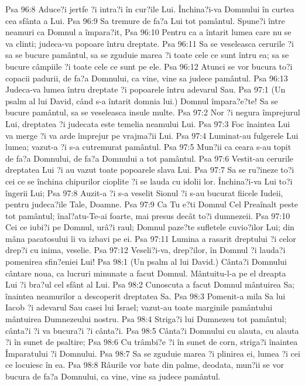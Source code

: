 Psa 96:8  Aduce?i jertfe ?i intra?i în cur?ile Lui. Închina?i-va Domnului în curtea cea sfânta a Lui.
Psa 96:9  Sa tremure de fa?a Lui tot pamântul. Spune?i între neamuri ca Domnul a împara?it,
Psa 96:10  Pentru ca a întarit lumea care nu se va clinti; judeca-va popoare întru dreptate.
Psa 96:11  Sa se veseleasca cerurile ?i sa se bucure pamântul, sa se zguduie marea ?i toate cele ce sunt întru ea; sa se bucure câmpiile ?i toate cele ce sunt pe ele.
Psa 96:12  Atunci se vor bucura to?i copacii padurii, de fa?a Domnului, ca vine, vine sa judece pamântul.
Psa 96:13  Judeca-va lumea întru dreptate ?i popoarele întru adevarul Sau.
Psa 97:1  (Un psalm al lui David, când s-a întarit domnia lui.) Domnul împara?e?te! Sa se bucure pamântul, sa se veseleasca insule multe.
Psa 97:2  Nor ?i negura împrejurul Lui, dreptatea ?i judecata este temelia neamului Lui.
Psa 97:3  Foc înaintea Lui va merge ?i va arde împrejur pe vrajma?ii Lui.
Psa 97:4  Luminat-au fulgerele Lui lumea; vazut-a ?i s-a cutremurat pamântul.
Psa 97:5  Mun?ii ca ceara s-au topit de fa?a Domnului, de fa?a Domnului a tot pamântul.
Psa 97:6  Vestit-au cerurile dreptatea Lui ?i au vazut toate popoarele slava Lui.
Psa 97:7  Sa se ru?ineze to?i cei ce se închina chipurilor cioplite ?i se lauda cu idolii lor. Închina?i-va Lui to?i îngerii Lui;
Psa 97:8  Auzit-a ?i s-a veselit Sionul ?i s-au bucurat fiicele Iudeii, pentru judeca?ile Tale, Doamne.
Psa 97:9  Ca Tu e?ti Domnul Cel Preaînalt peste tot pamântul; înal?atu-Te-ai foarte, mai presus decât to?i dumnezeii.
Psa 97:10  Cei ce iubi?i pe Domnul, urâ?i raul; Domnul paze?te sufletele cuvio?ilor Lui; din mâna pacatosului îi va izbavi pe ei.
Psa 97:11  Lumina a rasarit dreptului ?i celor drep?i cu inima, veselie.
Psa 97:12  Veseli?i-va, drep?ilor, în Domnul ?i lauda?i pomenirea sfin?eniei Lui!
Psa 98:1  (Un psalm al lui David.) Cânta?i Domnului cântare noua, ca lucruri minunate a facut Domnul. Mântuitu-l-a pe el dreapta Lui ?i bra?ul cel sfânt al Lui.
Psa 98:2  Cunoscuta a facut Domnul mântuirea Sa; înaintea neamurilor a descoperit dreptatea Sa.
Psa 98:3  Pomenit-a mila Sa lui Iacob ?i adevarul Sau casei lui Israel; vazut-au toate marginile pamântului mântuirea Dumnezeului nostru.
Psa 98:4  Striga?i lui Dumnezeu tot pamântul; cânta?i ?i va bucura?i ?i cânta?i.
Psa 98:5  Cânta?i Domnului cu alauta, cu alauta ?i în sunet de psaltire;
Psa 98:6  Cu trâmbi?e ?i în sunet de corn, striga?i înaintea Împaratului ?i Domnului.
Psa 98:7  Sa se zguduie marea ?i plinirea ei, lumea ?i cei ce locuiesc în ea.
Psa 98:8  Râurile vor bate din palme, deodata, mun?ii se vor bucura de fa?a Domnului, ca vine, vine sa judece pamântul.

